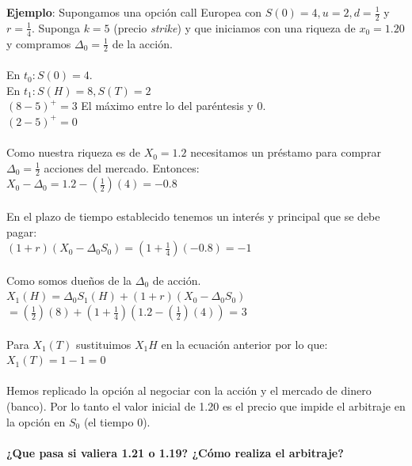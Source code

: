 \documentclass{article}
\begin{document}
        \textbf{Ejemplo}: Supongamos una opción call Europea con \(S(0)=4, u=2, d=\frac{1}{2}\) y \(r=\frac{1}{4}\). Suponga \(k=5\) (precio \textit{strike}) y que iniciamos con una riqueza de \(x_0 = 1.20\) y compramos \(\Delta_0=\frac{1}{2}\) de la acción.
        \\
        \\
        En \(t_0: S(0) = 4\).
        \\
        En \(t_1: S(H) = 8, S(T) = 2\)
        \\
        \((8-5)^{+} = 3\) El máximo entre lo del paréntesis y 0.
        \\
        \((2-5)^{+} = 0\)
        \\
        \\
        Como nuestra riqueza es de \(X_0 = 1.2\) necesitamos un préstamo para comprar \(\Delta_0=\frac{1}{2}\) acciones del mercado. Entonces:
        \\
        \(X_0-\Delta_0 = 1.2 - (\frac{1}{2}) (4) = -0.8\)
        \\
        \\
        En el plazo de tiempo establecido tenemos un interés y principal que se debe pagar:
        \\
        \((1+r) (X_0-\Delta_0S_0) = (1+\frac{1}{4}) (-0.8) = -1\)
        \\
        \\
        Como somos dueños de la \(\Delta_0\) de acción.
        \\
        \(X_1(H) = \Delta_0 S_1(H) + (1+r) (X_0 - \Delta_0 S_0)\)
        \\
        \(= (\frac{1}{2}) (8) + (1 + \frac{1}{4}) (1.2 - (\frac{1}{2}) (4))\) = 3
        \\
        \\
        Para \(X_1(T)\) sustituimos \(X_1{H}\) en la ecuación anterior por lo que:
        \\
        \(X_1(T) = 1-1 = 0\)
        \\
        \\
        Hemos replicado la opción al negociar con la acción y el mercado de dinero (banco). Por lo tanto el valor inicial de 1.20 es el precio que impide el arbitraje en la opción en \(S_0\) (el tiempo 0).
        \\
        \\
        \textbf{¿Que pasa si valiera 1.21 o 1.19? ¿Cómo realiza el arbitraje?}
        \\
        \\
\end{document}
